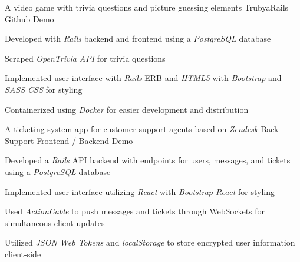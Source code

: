 \begin{cventries}
\cventry
    {A video game with trivia questions and picture guessing elements} %
    {TrubyaRails\vspace{-2.0mm}} %
    {\href{https://github.com/jhcheung/trubya-rails}{Github}\vspace{-2.0mm}} %
    {\href{https://trubya-rails.herokuapp.com/}{Demo}} %
    {
    \begin{cvitems} %
		\item {Developed with \textit{Rails} backend and frontend using a \textit{PostgreSQL} database}
		\item {Scraped \textit{OpenTrivia API} for trivia questions} 
		\item {Implemented user interface with \textit{Rails} ERB and \textit{HTML5} with \textit{Bootstrap} and \textit{SASS CSS} for styling}
		\item {Containerized using \textit{Docker} for easier development and distribution}
    \end{cvitems}
}

  \cventry
    {A ticketing system app for customer support agents based on \textit{Zendesk}} %
    {Back Support\vspace{-2.0mm}} %
    {\href{https://github.com/jhcheung/backsupport-client}{Frontend} / \href{https://github.com/jhcheung/backsupport-backend}{Backend}\vspace{-2.0mm}} %
    {\href{https://backsupport-client.herokuapp.com/}{Demo}} %
    {
      \begin{cvitems} %
		\item {Developed a \textit{Rails} API backend with endpoints for users, messages, and tickets using a \textit{PostgreSQL} database}
		\item {Implemented user interface utilizing \textit{React} with \textit{Bootstrap React} for styling}
		\item {Used \textit{ActionCable} to push messages and tickets through WebSockets for simultaneous client updates}
    \item {Utilized \textit{JSON Web Tokens} and \textit{localStorage} to store encrypted user information client-side}      
    \end{cvitems}
    }



\end{cventries}

